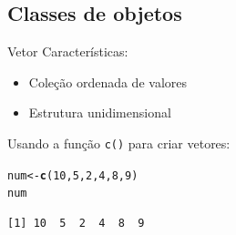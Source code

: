 \documentclass[10pt,handout]{beamer}\usepackage[]{graphicx}\usepackage[]{color}
\makeatletter
\newcommand{\hlnum}[1]{\textcolor[rgb]{0.686,0.059,0.569}{#1}}%
\newcommand{\hlstd}[1]{\textcolor[rgb]{0.345,0.345,0.345}{#1}}%
\newcommand{\hlkwb}[1]{\textcolor[rgb]{0.69,0.353,0.396}{#1}}%
\newcommand{\hlkwd}[1]{\textcolor[rgb]{0.282,0.239,0.545}{\textbf{#1}}}%
\newenvironment{kframe}{%
 \def\at@end@of@kframe{}%
 \ifinner\ifhmode%
  \def\at@end@of@kframe{\end{minipage}}%
  \begin{minipage}{\columnwidth}%
 \fi\fi%
 \def\FrameCommand##1{\hskip\@totalleftmargin \hskip-\fboxsep
 \colorbox{shadecolor}{##1}\hskip-\fboxsep
     \hskip-\linewidth \hskip-\@totalleftmargin \hskip\columnwidth}%
 \MakeFramed {\advance\hsize-\width
   \@totalleftmargin\z@ \linewidth\hsize
   \@setminipage}}%
 {\par\unskip\endMakeFramed%
 \at@end@of@kframe}
\newenvironment{knitrout}{}{} %
\makeatother
\begin{document}
\subsection[Classes]{Classes de objetos}

\begin{frame}[fragile]{Vetor}
Características:
\begin{itemize}
\item Coleção ordenada de valores
\item Estrutura unidimensional
\end{itemize}
Usando a função \texttt{c()} para criar vetores:
\begin{knitrout}\small
{}\color{fgcolor}\begin{kframe}
\begin{alltt}
\hlstd{num} \hlkwb{<-} \hlkwd{c}\hlstd{(}\hlnum{10}\hlstd{,} \hlnum{5}\hlstd{,} \hlnum{2}\hlstd{,} \hlnum{4}\hlstd{,} \hlnum{8}\hlstd{,} \hlnum{9}\hlstd{)}
\hlstd{num}
\end{alltt}
\begin{verbatim}
[1] 10  5  2  4  8  9
\end{verbatim}
\end{kframe}
\end{knitrout}

\end{frame}
\end{document}
